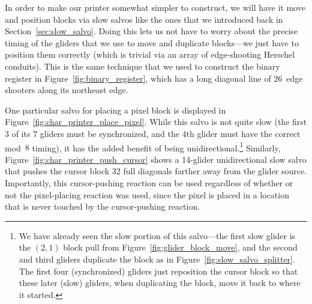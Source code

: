 In order to make our printer somewhat simpler to construct, we will have it move and position blocks via slow salvos like the ones that we introduced back in Section~\ref{sec:slow_salvo}. Doing this lets us not have to worry about the precise timing of the gliders that we use to move and duplicate blocks---we just have to position them correctly (which is trivial via an array of edge-shooting Herschel conduits). This is the same technique that we used to construct the binary register in Figure~\ref{fig:binary_register}, which has a long diagonal line of $26$~edge shooters along its northeast edge.

One particular salvo for placing a pixel block is displayed in Figure~\ref{fig:char_printer_place_pixel}. While this salvo is not quite slow (the first $3$ of its $7$ gliders must be synchronized, and the $4$th glider must have the correct mod~$8$ timing), it has the added benefit of being unidirectional.\footnote{We have already seen the slow portion of this salvo---the first slow glider is the $(2,1)$ block pull from Figure~\ref{fig:glider_block_move}, and the second and third gliders duplicate the block as in Figure~\ref{fig:slow_salvo_splitter}. The first four (synchronized) gliders just reposition the cursor block so that these later (slow) gliders, when duplicating the block, move it back to where it started.} Similarly, Figure~\ref{fig:char_printer_push_cursor} shows a 14-glider unidirectional slow salvo that pushes the cursor block 32 full diagonals farther away from the glider source. Importantly, this cursor-pushing reaction can be used regardless of whether or not the pixel-placing reaction was used, since the pixel is placed in a location that is never touched by the cursor-pushing reaction.


